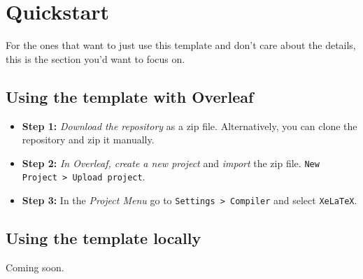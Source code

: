 \section { Quickstart }
  For the ones that want to just use this template and don't care about the details, this is the 
  section you'd want to focus on.

  \subsection { Using the template with Overleaf }
    \begin{itemize}
      \item \textbf{Step 1:} \textit{Download the repository} as a zip file. 
        Alternatively, you can clone the repository and zip it manually.
      \item \textbf{Step 2:} \textit{In Overleaf, create a new project} and \textit{import} the zip 
        file.
        \texttt{New Project > Upload project}.
      \item \textbf{Step 3:} In the \textit{Project Menu} go to \texttt{Settings > Compiler} and 
        select \texttt{XeLaTeX}.
    \end{itemize}
  
  \subsection{ Using the template locally }
    Coming soon.

